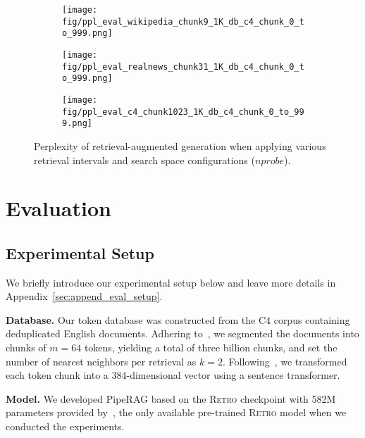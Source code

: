 \begin{figure*}%
\begin{subfigure}
    \centering
    \texttt{[image: fig/ppl\_eval\_wikipedia\_chunk9\_1K\_db\_c4\_chunk\_0\_to\_999.png]}
\end{subfigure}
\hfill
\begin{subfigure}
    \centering
    \texttt{[image: fig/ppl\_eval\_realnews\_chunk31\_1K\_db\_c4\_chunk\_0\_to\_999.png]}
\end{subfigure}
\hfill
\begin{subfigure}
    \centering
    \texttt{[image: fig/ppl\_eval\_c4\_chunk1023\_1K\_db\_c4\_chunk\_0\_to\_999.png]}
\end{subfigure}
\hfill

  \vspace{-1em}
  \caption{Perplexity of retrieval-augmented generation when applying various retrieval intervals and search space configurations (\( nprobe \)).}
  \vspace{-1em}
  \label{fig:eval_ppl}
\end{figure*}

\section{Evaluation}
\label{sec:evaluation}

\subsection{Experimental Setup}

We briefly introduce our experimental setup below and leave more details in Appendix~\ref{sec:append_eval_setup}.

\textbf{Database.}
Our token database was constructed from the C4 corpus containing deduplicated English documents. Adhering to~\citet{borgeaud2022improving}, we segmented the documents into chunks of \( m=64 \) tokens, yielding a total of three billion chunks, and set the number of nearest neighbors per retrieval as \(k=2 \). Following~\citet{norlund2023generalization}, we transformed each token chunk into a 384-dimensional vector using a sentence transformer\cite{reimers2019sentence}. 

\textbf{Model.}
We developed PipeRAG based on the \textsc{Retro} checkpoint with 582M parameters provided by~\citet{norlund2023generalization}, the only available pre-trained \textsc{Retro} model when we conducted the experiments. 

